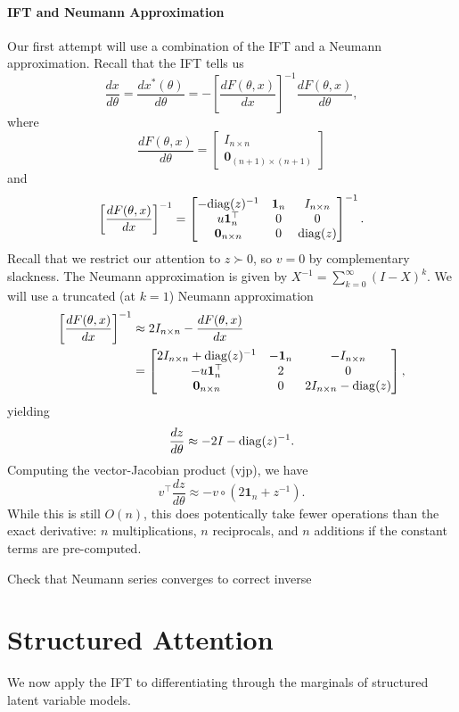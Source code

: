 \documentclass[11pt]{article}
\begin{document}
\paragraph{IFT and Neumann Approximation}
Our first attempt will use a combination of the IFT and a Neumann approximation.
Recall that the IFT tells us
$$\frac{dx}{d\theta} = \frac{dx^*(\theta)}{d\theta}
= -\left[\frac{dF(\theta,x)}{dx}\right]^{-1}\frac{dF(\theta,x)}{d\theta},$$
where 
$$\frac{dF(\theta,x)}{d\theta} = \begin{bmatrix}
    I_{n\times n}\\
    \mathbf{0}_{(n+1)\times (n+1)}
\end{bmatrix}$$
and
$$
\left[\frac{dF(\theta,x)}{dx}\right]^{-1} = \begin{bmatrix}
-\mathrm{diag}(z)^{-1} & \mathbf{1}_n & I_{n\times n} \\
u\mathbf{1}_n^\top & 0 & 0\\
\mathbf{0}_{n\times n} & 0 & \mathrm{diag}(z)
\end{bmatrix}^{-1}.
$$
Recall that we restrict our attention to $z\succ 0$, so $v=0$ by complementary slackness. 
The Neumann approximation is given by $X^{-1} = \sum_{k=0}^\infty (I-X)^k$.
We will use a truncated (at $k=1$) Neumann approximation
\begin{align*}
    \left[\frac{dF(\theta,x)}{dx}\right]^{-1}
    &\approx 2I_{n \times n} - \frac{dF(\theta,x)}{dx}\\
    &= \begin{bmatrix}
    2I_{n\times n} + \mathrm{diag}(z)^{-1} & -\mathbf{1}_n & -I_{n\times n} \\
    -u\mathbf{1}_n^\top & 2 & 0\\
    \mathbf{0}_{n\times n} & 0 & 2I_{n\times n}-\mathrm{diag}(z)
    \end{bmatrix},
\end{align*}
yielding
$$\frac{dz}{d\theta}\approx -2I - \mathrm{diag}(z)^{-1}.$$
Computing the vector-Jacobian product (vjp), we have
$$v^\top \frac{dz}{d\theta} \approx -v \circ(2\mathbf{1}_n + z^{-1}).$$
While this is still $O(n)$, this does potentically take fewer operations than the exact derivative:
$n$ multiplications, $n$ reciprocals, and $n$ additions if the constant terms are pre-computed.

{\color{red} Check that Neumann series converges to correct inverse}

\section{Structured Attention}
We now apply the IFT to differentiating through the marginals of
structured latent variable models.
\end{document}
